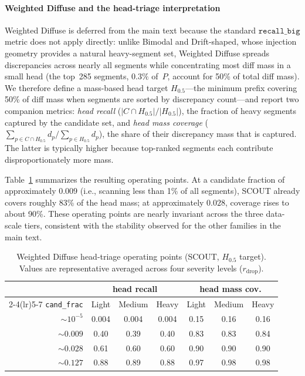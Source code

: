 \paragraph{Weighted Diffuse and the head-triage interpretation}
\label{sec:appendix-ycsb-weighted}
Weighted Diffuse is deferred from the main text because the
standard $\texttt{recall\_big}$ metric does not apply
directly: unlike Bimodal and Drift-shaped, whose injection
geometry provides a natural heavy-segment set, Weighted
Diffuse spreads discrepancies across nearly all segments
while concentrating most diff mass in a small head
(the top~285 segments, $0.3\%$ of~$P$, account for 50\%
of total diff mass). We therefore define a mass-based head
target $H_{0.5}$---the minimum prefix covering 50\% of diff
mass when segments are sorted by discrepancy count---and
report two companion metrics: \emph{head recall}
($|C \cap H_{0.5}|/|H_{0.5}|$), the fraction of heavy
segments captured by the candidate set, and \emph{head mass
coverage} ($\sum_{p\in C\cap H_{0.5}} d_p / \sum_{p\in
H_{0.5}} d_p$), the share of their discrepancy mass that is
captured. The latter is typically higher because top-ranked
segments each contribute disproportionately more mass.

Table~\ref{tab:c6-weighted-head} summarizes the resulting
operating points.  At a candidate fraction of approximately
$0.009$ (i.e., scanning less than 1\% of all segments),
SCOUT already covers roughly 83\% of the head mass; at
approximately $0.028$, coverage rises to about 90\%.
These operating points are nearly invariant across the three
data-scale tiers, consistent with the stability observed for
the other families in the main text.

\begin{table}[!htbp]
\centering
\small
\setlength{\tabcolsep}{3pt}
\begin{tabular}{rcccccc}
\toprule
 & \multicolumn{3}{c}{head recall} & \multicolumn{3}{c}{head mass cov.} \\
\cmidrule(lr){2-4}\cmidrule(lr){5-7}
\texttt{cand\_frac} & Light & Medium & Heavy & Light & Medium & Heavy \\
\midrule
${\sim}10^{-5}$  & 0.004 & 0.004 & 0.004 & 0.15 & 0.16 & 0.16 \\
${\sim}0.009$    & 0.40  & 0.39  & 0.40  & 0.83 & 0.83 & 0.84 \\
${\sim}0.028$    & 0.61  & 0.60  & 0.60  & 0.90 & 0.90 & 0.90 \\
${\sim}0.127$    & 0.88  & 0.89  & 0.88  & 0.97 & 0.98 & 0.98 \\
\bottomrule
\end{tabular}
\caption{Weighted Diffuse head-triage operating points
  (SCOUT, $H_{0.5}$ target). Values are representative
  averaged across four severity levels 
  ($r_{\text{drop}}$).}
\label{tab:c6-weighted-head}
\end{table}

